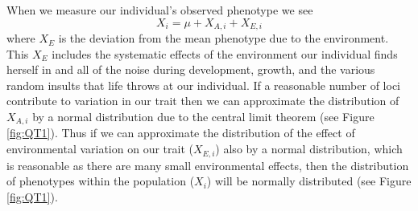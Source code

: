 When we measure our individual's observed phenotype we see
\begin{equation}
X_i =   \mu+X_{A,i} + X_{E,i} \label{pheno_geno_environ}
\end{equation}
where $X_E$ is the deviation from the mean phenotype due to the
environment. This $X_E$ includes the systematic effects of the environment
our individual finds herself in and all of the noise during
development, growth, and the various random insults that life throws
at our individual. If a reasonable number of loci contribute to
variation in our trait then we can approximate the distribution of
$X_{A,i}$ by a normal distribution due to the central limit theorem (see Figure \ref{fig:QT1}). Thus if we can
approximate the distribution of the effect of environmental variation
on our trait ($X_{E,i}$) also by a normal distribution, which is
reasonable as there are many small environmental effects, then the
distribution of phenotypes within the population ($X_i$) will be
normally distributed (see Figure \ref{fig:QT1}).\\


